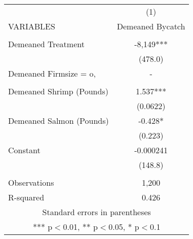 \begin{tabular}{lc} \hline
 & (1) \\
VARIABLES & Demeaned Bycatch \\ \hline
 &  \\
Demeaned Treatment & -8,149*** \\
 & (478.0) \\
Demeaned Firmsize = o, & - \\
 &  \\
Demeaned Shrimp (Pounds) & 1.537*** \\
 & (0.0622) \\
Demeaned Salmon (Pounds) & -0.428* \\
 & (0.223) \\
Constant & -0.000241 \\
 & (148.8) \\
 &  \\
Observations & 1,200 \\
 R-squared & 0.426 \\ \hline
\multicolumn{2}{c}{ Standard errors in parentheses} \\
\multicolumn{2}{c}{ *** p$<$0.01, ** p$<$0.05, * p$<$0.1} \\
\end{tabular}
